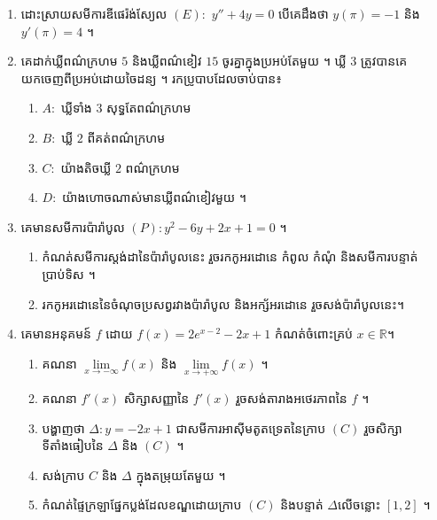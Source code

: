 \documentclass[a4paper,11pt]{article}
\begin{document}
\begin{enumerate}[I]
		\item ដោះស្រាយសមីការឌីផេរ៉ង់ស្យែល $(E):$ $y''+4y = 0$ បើគេដឹងថា $y(\pi) =-1$ និង $y'(\pi) =4$ ។ 
		\item គេដាក់ឃ្លីពណ៌ក្រហម $5$ និងឃ្លីពណ៌ខៀវ $15$ ចូរគ្នាក្នុងប្រអប់តែមួយ ។ ឃ្លី $3$ ត្រូវបានគេយកចេញពីប្រអប់ដោយចៃដន្យ ។ រកប្រូបាបដែលចាប់បាន៖
		\begin{enumerate}[a]
			\item $A:$ ឃ្លីទាំង $3$ សុទ្ធតែពណ៌ក្រហម
			\item $B:$ ឃ្លី $2$ ពីគត់ពណ៌ក្រហម 
			\item $C:$ យ៉ាងតិចឃ្លី $2$ ពណ៌ក្រហម
			\item $D:$ យ៉ាងហោចណាស់មានឃ្លីពណ៌ខៀវមួយ ។ 
		\end{enumerate}
		\item គេមានសមីការប៉ារ៉ាបូល $(P): y^2-6y+2x+1=0$ ។
		\begin{enumerate}[a]
			\item កំណត់សមីការស្តង់ដានៃប៉ារ៉ាបូលនេះ រួចរកកូអរដោនេ កំពូល កំណុំ និងសមីការបន្ទាត់ប្រាប់ទិស ។
			\item រកកូអរដោនេនៃចំណុចប្រសព្វរវាងប៉ារ៉ាបូល និងអក្ស័អរដោនេ រួចសង់ប៉ារ៉ាបូលនេះ​ ។ 
		\end{enumerate}
		\item គេមានអនុគមន៍ $f$ ដោយ $f(x) = 2e^{x-2}-2x+1$ កំណត់ចំពោះគ្រប់ $x\in\mathbb{R}$​។
		\begin{enumerate}[a]
			\item គណនា $\lim\limits_{x\to-\infty} f(x)$ និង $\lim\limits_{x\to+\infty} f(x)$ ។
			\item គណនា $f'(x)$ សិក្សាសញ្ញានៃ $f'(x)$ រួចសង់តារាងអថេរភាពនៃ $f$ ។
			\item បង្ហាញថា $\Delta:​y=-2x+1$ ជាសមីការអាស៊ីមតូតទ្រេតនៃក្រាប $(C)$  រួចសិក្សាទីតាំងធៀបនៃ $\Delta$ និង $(C)$ ។
			\item សង់ក្រាប $C$ និង $\Delta$ ក្នុងតម្រុយតែមួយ ។
			\item កំណត់ផ្ទៃក្រឡាផ្នែកប្លង់ដែលខណ្ឌដោយក្រាប $(C)$ និងបន្ទាត់ $\Delta$​លើចន្លោះ $[1,2]$ ។
		\end{enumerate}
	\end{enumerate}
\end{document}
